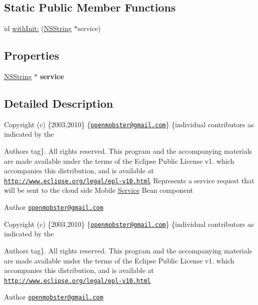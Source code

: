 \subsection*{\-Static \-Public \-Member \-Functions}
\begin{DoxyCompactItemize}
\item 
id \hyperlink{interface_request_a2a1bf25de9bc9de1b31b09c2c19c07b7}{with\-Init\-:} (\hyperlink{class_n_s_string}{\-N\-S\-String} $\ast$service)
\end{DoxyCompactItemize}
\subsection*{\-Properties}
\begin{DoxyCompactItemize}
\item 
\hypertarget{interface_request_a9bc63cab41bd9c57afdb8b590f1b65c2}{
\hyperlink{class_n_s_string}{\-N\-S\-String} $\ast$ {\bfseries service}}
\label{interface_request_a9bc63cab41bd9c57afdb8b590f1b65c2}

\end{DoxyCompactItemize}


\subsection{\-Detailed \-Description}
\-Copyright (c) \{2003,2010\} \{\href{mailto:openmobster@gmail.com}{\tt openmobster@gmail.\-com}\} \{individual contributors as indicated by the \begin{DoxyAuthor}{\-Authors}
tag\}. \-All rights reserved. \-This program and the accompanying materials are made available under the terms of the \-Eclipse \-Public \-License v1. which accompanies this distribution, and is available at \href{http://www.eclipse.org/legal/epl-v10.html}{\tt http\-://www.\-eclipse.\-org/legal/epl-\/v10.\-html} \-Represents a service request that will be sent to the cloud side \-Mobile \hyperlink{interface_service}{\-Service} \-Bean component
\end{DoxyAuthor}
\begin{DoxyAuthor}{\-Author}
\href{mailto:openmobster@gmail.com}{\tt openmobster@gmail.\-com}
\end{DoxyAuthor}
\-Copyright (c) \{2003,2010\} \{\href{mailto:openmobster@gmail.com}{\tt openmobster@gmail.\-com}\} \{individual contributors as indicated by the \begin{DoxyAuthor}{\-Authors}
tag\}. \-All rights reserved. \-This program and the accompanying materials are made available under the terms of the \-Eclipse \-Public \-License v1. which accompanies this distribution, and is available at \href{http://www.eclipse.org/legal/epl-v10.html}{\tt http\-://www.\-eclipse.\-org/legal/epl-\/v10.\-html}
\end{DoxyAuthor}
\begin{DoxyAuthor}{\-Author}
\href{mailto:openmobster@gmail.com}{\tt openmobster@gmail.\-com} 
\end{DoxyAuthor}



